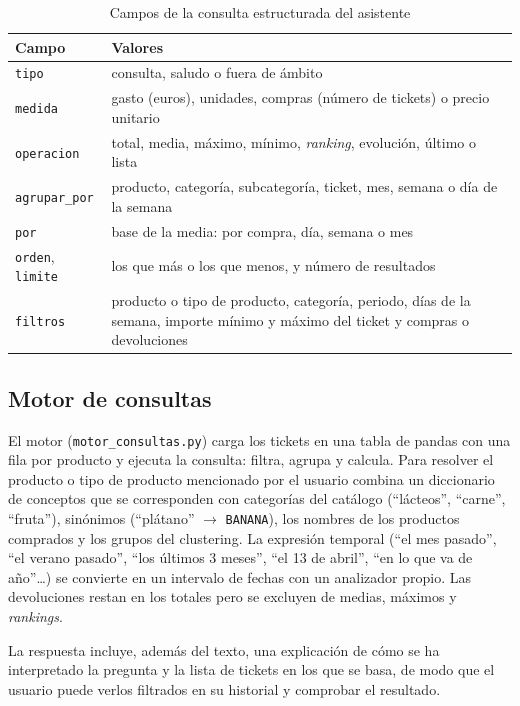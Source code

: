 \begin{table}[htbp]
    \caption{\label{tab:consulta}Campos de la consulta estructurada del asistente}
    \begin{tabularx}{\textwidth}{@{}lX@{}}
        \toprule
        \textbf{Campo} & \textbf{Valores} \\
        \midrule
        \texttt{tipo} & consulta, saludo o fuera de ámbito \\
        \texttt{medida} & gasto (euros), unidades, compras (número de tickets) o precio unitario \\
        \texttt{operacion} & total, media, máximo, mínimo, \textit{ranking}, evolución, último o lista \\
        \texttt{agrupar\_por} & producto, categoría, subcategoría, ticket, mes, semana o día de la semana \\
        \texttt{por} & base de la media: por compra, día, semana o mes \\
        \texttt{orden}, \texttt{limite} & los que más o los que menos, y número de resultados \\
        \texttt{filtros} & producto o tipo de producto, categoría, periodo, días de la semana, importe mínimo y máximo del ticket y compras o devoluciones \\
        \bottomrule
    \end{tabularx}
\end{table}

\subsection{Motor de consultas}
El motor (\texttt{motor\_consultas.py}) carga los tickets en una tabla de pandas con una fila por producto y ejecuta la consulta: filtra, agrupa y calcula. Para resolver el producto o tipo de producto mencionado por el usuario combina un diccionario de conceptos que se corresponden con categorías del catálogo (\enquote{lácteos}, \enquote{carne}, \enquote{fruta}), sinónimos (\enquote{plátano} $\rightarrow$ \texttt{BANANA}), los nombres de los productos comprados y los grupos del clustering. La expresión temporal (\enquote{el mes pasado}, \enquote{el verano pasado}, \enquote{los últimos 3 meses}, \enquote{el 13 de abril}, \enquote{en lo que va de año}\ldots) se convierte en un intervalo de fechas con un analizador propio. Las devoluciones restan en los totales pero se excluyen de medias, máximos y \textit{rankings}.

La respuesta incluye, además del texto, una explicación de cómo se ha interpretado la pregunta y la lista de tickets en los que se basa, de modo que el usuario puede verlos filtrados en su historial y comprobar el resultado.

